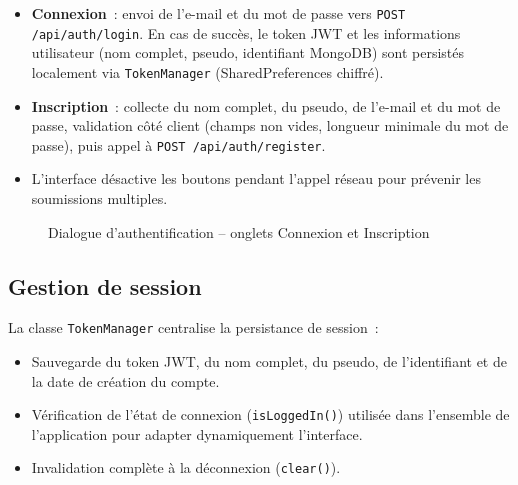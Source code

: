 \documentclass[12pt, a4paper, openany]{report}
\begin{document}
\begin{itemize}
  \item \textbf{Connexion}~: envoi de l'e-mail et du mot de passe vers \texttt{POST /api/auth/login}.
        En cas de succès, le token JWT et les informations utilisateur (nom complet,
        pseudo, identifiant MongoDB) sont persistés localement via \texttt{TokenManager}
        (SharedPreferences chiffré).
  \item \textbf{Inscription}~: collecte du nom complet, du pseudo, de l'e-mail et du mot de
        passe, validation côté client (champs non vides, longueur minimale du mot de passe),
        puis appel à \texttt{POST /api/auth/register}.
  \item L'interface désactive les boutons pendant l'appel réseau pour prévenir les
        soumissions multiples.
\end{itemize}

\begin{figure}[H]
  \centering
  \caption{Dialogue d'authentification -- onglets Connexion et Inscription}
  \label{fig:auth}
\end{figure}

\subsection{Gestion de session}

La classe \texttt{TokenManager} centralise la persistance de session~:
\begin{itemize}
  \item Sauvegarde du token JWT, du nom complet, du pseudo, de l'identifiant et de la date
        de création du compte.
  \item Vérification de l'état de connexion (\texttt{isLoggedIn()}) utilisée dans
        l'ensemble de l'application pour adapter dynamiquement l'interface.
  \item Invalidation complète à la déconnexion (\texttt{clear()}).
\end{itemize}
\end{document}
